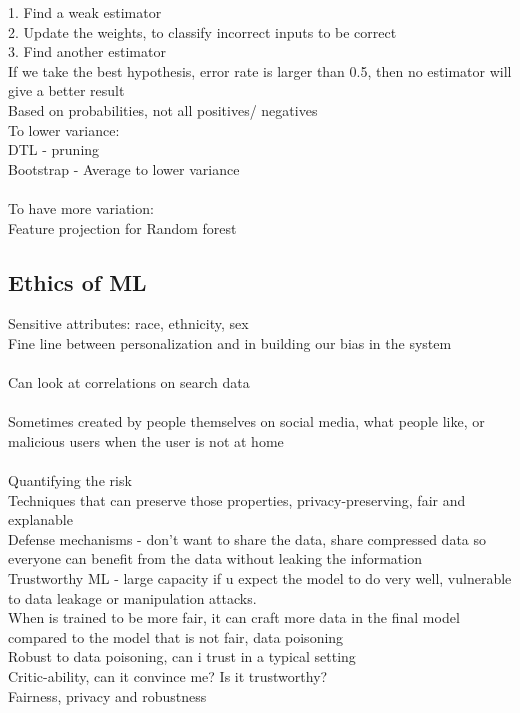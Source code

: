 \documentclass[11pt]{article}
\begin{document}
1. Find a weak estimator
\\2. Update the weights, to classify incorrect inputs to be correct
\\3. Find another estimator
\\
If we take the best hypothesis, error rate is larger than 0.5, then no estimator will give a better result
\\
Based on probabilities, not all positives/ negatives\\
To lower variance: \\
DTL - pruning\\
Bootstrap - Average to lower variance\\
\\
To have more variation: \\
Feature projection for Random forest
\subsection{Ethics of ML}
Sensitive attributes: race, ethnicity, sex\\
Fine line between personalization and in building our bias in the system\\\\
Can look at correlations on search data\\
\\
Sometimes created by people themselves on social media, what people like, or malicious users when the user is not at home\\\\
Quantifying the risk\\
Techniques that can preserve those properties, privacy-preserving, fair and explanable\\
Defense mechanisms - don't want to share the data, share compressed data so everyone can benefit from the data without leaking the information
\\
Trustworthy ML - large capacity if u expect the model to do very well, vulnerable to data leakage or manipulation attacks. 
\\
When is trained to be more fair, it can craft more data in the final model compared to the model that is not fair, data poisoning 
\\
Robust to data poisoning, can i trust in a typical setting\\
Critic-ability, can it convince me? Is it trustworthy?\\
Fairness, privacy and robustness\\\\
\end{document}
